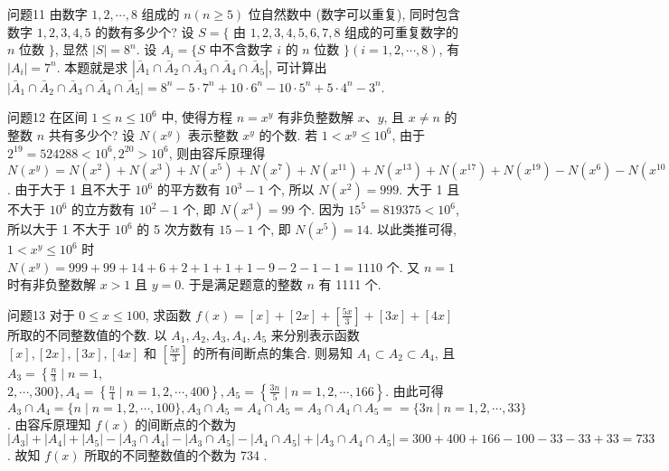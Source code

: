 问题11 由数字 $1,2, \cdots, 8$ 组成的 $n(n \geqslant 5)$ 位自然数中 (数字可以重复), 同时包含数字 $1,2,3,4,5$ 的数有多少个?
设 $S=\{$ 由 $1,2,3,4,5,6,7,8$ 组成的可重复数字的 $n$ 位数 $\}$, 显然 $|S|=8^n$. 设 $A_i=\{S$ 中不含数字 $i$ 的 $n$ 位数 $\}(i=1,2, \cdots, 8)$, 有 $\left|A_i\right|=7^n$. 本题就是求 $\left|\bar{A}_1 \cap \bar{A}_2 \cap \bar{A}_3 \cap \bar{A}_4 \cap \bar{A}_5\right|$, 可计算出 $\mid \bar{A}_1 \cap \bar{A}_2 \cap \bar{A}_3 \cap \bar{A}_4 \cap \bar{A}_5 \mid=8^n-5 \cdot 7^n+10 \cdot 6^n-10 \cdot 5^n+5 \cdot 4^n-3^n$.



问题12 在区间 $1 \leqslant n \leqslant 10^6$ 中, 使得方程 $n=x^y$ 有非负整数解 $x 、 y$, 且 $x \neq n$ 的整数 $n$ 共有多少个?
设 $N\left(x^y\right)$ 表示整数 $x^y$ 的个数.
若 $1<x^y \leqslant 10^6$, 由于 $2^{19}= 524288<10^6, 2^{20}>10^6$, 则由容斥原理得 $N\left(x^y\right)=N\left(x^2\right)+N\left(x^3\right)+ N\left(x^5\right)+N\left(x^7\right)+N\left(x^{11}\right)+N\left(x^{13}\right)+N\left(x^{17}\right)+N\left(x^{19}\right)-N\left(x^6\right)-N\left(x^{10}\right)- N\left(x^{14}\right)-N\left(x^{15}\right)$. 由于大于 1 且不大于 $10^6$ 的平方数有 $10^3-1$ 个, 所以 $N\left(x^2\right)=999$. 大于 1 且不大于 $10^6$ 的立方数有 $10^2-1$ 个, 即 $N\left(x^3\right)=99$ 个.
因为 $15^5=819375<10^6$, 所以大于 1 不大于 $10^6$ 的 5 次方数有 $15-1$ 个, 即 $N\left(x^5\right)=14$. 以此类推可得, $1<x^y \leqslant 10^6$ 时 $N\left(x^y\right)=999+99+14+6+ 2+1+1+1-9-2-1-1=1110$ 个.
又 $n=1$ 时有非负整数解 $x>1$ 且 $y=0$. 于是满足题意的整数 $n$ 有 1111 个.



问题13 对于 $0 \leqslant x \leqslant 100$, 求函数 $f(x)=[x]+[2 x]+\left[\frac{5 x}{3}\right]+[3 x]+[4 x]$ 所取的不同整数值的个数.
以 $A_1, A_2, A_3, A_4, A_5$ 来分别表示函数 $[x],[2 x],[3 x],[4 x]$ 和 $\left[\frac{5 x}{3}\right]$ 的所有间断点的集合.
则易知 $A_1 \subset A_2 \subset A_4$, 且 $A_3=\left\{\frac{n}{3} \mid n=1\right.$, $2, \cdots, 300\}, A_4=\left\{\frac{n}{4} \mid n=1,2, \cdots, 400\right\}, A_5=\left\{\frac{3 n}{5} \mid n=1,2, \cdots, 166\right\}$. 由此可得 $A_3 \cap A_4=\{n \mid n=1,2, \cdots, 100\}, A_3 \cap A_5=A_4 \cap A_5=A_3 \cap A_4 \cap A_5==\{3 n \mid n=1,2, \cdots, 33\}$. 由容斥原理知 $f(x)$ 的间断点的个数为 $\left|A_3\right|+\left|A_4\right|+\left|A_5\right|-\left|A_3 \cap A_4\right|-\left|A_3 \cap A_5\right|-\left|A_4 \cap A_5\right|+\mid A_3 \cap A_4 \cap A_5 \mid=300+400+166-100-33-33+33=733$. 故知 $f(x)$ 所取的不同整数值的个数为 734 .



